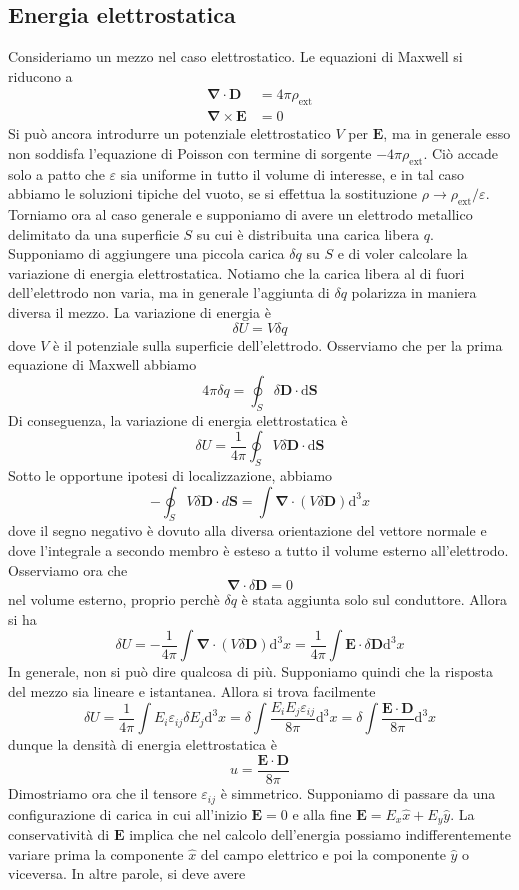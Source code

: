 \documentclass[a4paper,11pt]{book}
\renewcommand{\d}{\mathrm{d}}
\let\oldnabla\nabla
\renewcommand{\nabla}{\vec{\oldnabla}}
\renewcommand{\vec}[1]{\mathbf{#1}}
\newcommand{\ext}{\textrm{ext}}
\theoremstyle{theorem}
\theoremstyle{definition}
\begin{document}
\subsection{Energia elettrostatica}
Consideriamo un mezzo nel caso elettrostatico. Le equazioni di Maxwell si riducono a 
\begin{align*}
	\nabla\cdot\vec{D}&=4\pi\rho_\textrm{ext}\\
	\nabla\times\vec{E}&=0
\end{align*}
Si può ancora introdurre un potenziale elettrostatico $V$ per $\vec{E}$, ma in generale esso non soddisfa l'equazione di Poisson con termine di sorgente $-4\pi\rho_\ext$. Ciò accade solo a patto che $\varepsilon$ sia uniforme in tutto il volume di interesse, e in tal caso abbiamo le soluzioni tipiche del vuoto, se si effettua la sostituzione $\rho\to\rho_\ext/\varepsilon$. Torniamo ora al caso generale e supponiamo di avere un elettrodo metallico delimitato da una superficie $S$ su cui è distribuita una carica libera $q$. Supponiamo di aggiungere una piccola carica $\delta q$ su $S$ e di voler calcolare la variazione di energia elettrostatica. Notiamo che la carica libera al di fuori dell'elettrodo non varia, ma in generale l'aggiunta di $\delta q$ polarizza in maniera diversa il mezzo. La variazione di energia è
\[\delta U=V\delta q\]
dove $V$ è il potenziale sulla superficie dell'elettrodo. Osserviamo che per la prima equazione di Maxwell abbiamo
\[4\pi\delta q=\oint_S\delta\vec{D}\cdot\d\vec{S}\]
Di conseguenza, la variazione di energia elettrostatica è
\[\delta U=\frac{1}{4\pi}\oint_S V\delta\vec{D}\cdot\d\vec{S}\]
Sotto le opportune ipotesi di localizzazione, abbiamo
\[-\oint_S V\delta\vec{D}\cdot d\vec{S}=\int\nabla\cdot(V\delta\vec{D})\d^3x\]
dove il segno negativo è dovuto alla diversa orientazione del vettore normale e dove l'integrale a secondo membro è esteso a tutto il volume esterno all'elettrodo. Osserviamo ora che
\[\nabla\cdot\delta\vec{D}=0\]
nel volume esterno, proprio perchè $\delta q$ è stata aggiunta solo sul conduttore. Allora si ha 
\[\delta U=-\frac{1}{4\pi}\int\nabla \cdot(V\delta\vec{D})\d^3x=\frac{1}{4\pi}\int\vec{E}\cdot\delta\vec{D}\d^3x\]
In generale, non si può dire qualcosa di più. Supponiamo quindi che la risposta del mezzo sia lineare e istantanea. Allora si trova facilmente
\[\delta U=\frac{1}{4\pi}\int E_i\varepsilon_{ij}\delta E_j\d^3x=\delta\int\frac{E_iE_j\varepsilon_{ij}}{8\pi}\d^3x=\delta\int\frac{\vec{E}\cdot\vec{D}}{8\pi}\d^3x\]
dunque la densità di energia elettrostatica è
\[u=\frac{\vec{E}\cdot\vec{D}}{8\pi}\]
Dimostriamo ora che il tensore $\varepsilon_{ij}$ è simmetrico. Supponiamo di passare da una configurazione di carica in cui all'inizio $\vec{E}=0$ e alla fine $\vec{E}=E_x\hat{x}+E_y\hat{y}$. La conservatività di $\vec{E}$ implica che nel calcolo dell'energia possiamo indifferentemente variare prima la componente $\hat{x}$ del campo elettrico e poi la componente $\hat{y}$ o viceversa. In altre parole, si deve avere
\end{document}
